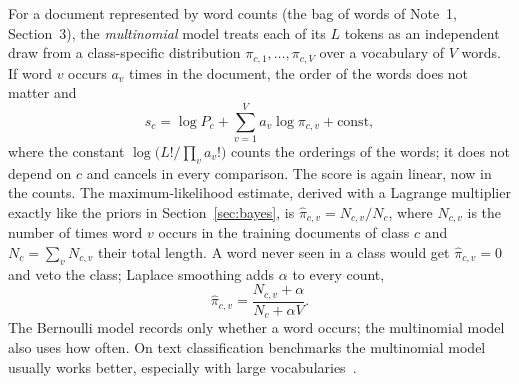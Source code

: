 \documentclass[11pt]{article}
\begin{document}
For a document represented by word counts (the bag of words of Note~1, Section~3), the \emph{multinomial} model treats
each of its $L$ tokens as an independent draw from a class-specific distribution $\pi_{c,1}, \dots, \pi_{c,V}$ over a
vocabulary of $V$ words. If word $v$ occurs $a_v$ times in the document, the order of the words does not matter and
\[
  s_c = \log P_c + \sum_{v=1}^V a_v \log \pi_{c,v} + \text{const},
\]
where the constant $\log\big(L!/\prod_v a_v!\big)$ counts the orderings of the words; it does not depend on $c$ and
cancels in every comparison. The score is again linear, now in the counts. The maximum-likelihood estimate, derived with a Lagrange multiplier exactly like
the priors in Section~\ref{sec:bayes}, is $\hat\pi_{c,v} = N_{c,v} / N_c$, where $N_{c,v}$ is the number of times word
$v$ occurs in the training documents of class $c$ and $N_c = \sum_v N_{c,v}$ their total length. A word never seen in a
class would get $\hat\pi_{c,v} = 0$ and veto the class; Laplace smoothing adds $\alpha$ to every count,
\begin{equation}\label{eq:multsmooth}
  \hat\pi_{c,v} = \frac{N_{c,v} + \alpha}{N_c + \alpha V} .
\end{equation}
The Bernoulli model records only whether a word occurs; the multinomial model also uses how often. On text
classification benchmarks the multinomial model usually works better, especially with large
vocabularies~\cite{mccallum1998}.
\end{document}
